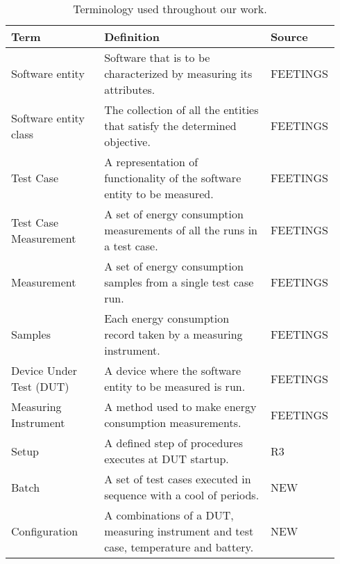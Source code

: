 
\begin{table}[ht]
    \begin{tabular}{|| p{0.29\linewidth} | p{0.5\linewidth}| p{0.15\linewidth}||}
        \hline
        \textbf{Term}& \textbf{Definition} & \textbf{Source} \\ [0.5ex]\hline\hline
        Software entity & Software that is to be characterized by measuring its attributes.         & FEETINGS\cite{GarciaFEETINGS}        \\ \hline
        Software entity class & The collection of all the entities that satisfy the determined objective. & FEETINGS\cite{GarciaFEETINGS}        \\ \hline
        Test Case & A representation of functionality of the software entity to be measured.  & FEETINGS\cite{GarciaFEETINGS}         \\ \hline
        Test Case Measurement & A set of energy consumption measurements of all the runs in a test case.  & FEETINGS\cite{GarciaFEETINGS}         \\ \hline
        Measurement & A set of energy consumption samples from a single test case run.       & FEETINGS\cite{GarciaFEETINGS}         \\ \hline
        Samples & Each energy consumption record taken by a measuring instrument.           & FEETINGS\cite{GarciaFEETINGS}         \\ \hline
        Device Under Test (DUT) & A device where the software entity to be measured is run.                 & FEETINGS\cite{GarciaFEETINGS}         \\ \hline
        Measuring Instrument & A method used to make energy consumption measurements.                    & FEETINGS\cite{GarciaFEETINGS}         \\ \hline
        Setup & A defined step of procedures executes at DUT startup.                     & R3\cite{Bokhari2020r3}              \\ \hline
        Batch\ & A set of test cases executed in sequence with a cool of periods.            & NEW             \\ \hline
        Configuration\ & A combinations of a DUT, measuring instrument and test case, temperature and battery.            & NEW             \\ \hline
    
    \end{tabular}
    \caption{Terminology used throughout our work.}
    \label{tab:TerminologyAlert}
    \end{table}